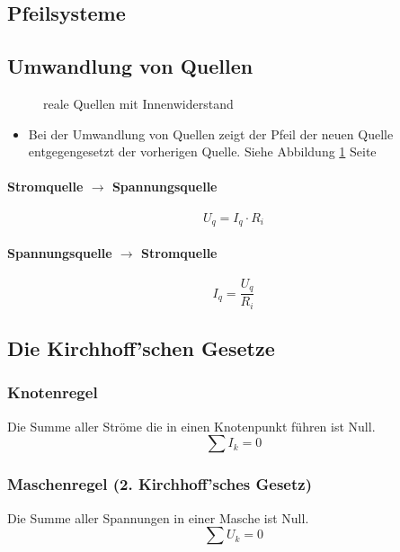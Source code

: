 \subsection{Pfeilsysteme}
\label{sec:Pfeilsysteme}

\subsection{Umwandlung von Quellen}
\label{sec:UmwandlungVonQuellen}


\begin{figure}[H]
	\centering
	\caption{reale Quellen mit Innenwiderstand}
	\label{fig:reale_Quellen}
\end{figure}


\begin{itemize}
	\item Bei der Umwandlung von Quellen zeigt der Pfeil der neuen Quelle entgegengesetzt der vorherigen Quelle. Siehe Abbildung \ref{fig:reale_Quellen} Seite 
\end{itemize}
\pageref{fig:reale_Quellen}

\paragraph{Stromquelle $\rightarrow$ Spannungsquelle}
\label{sec:StromquelleSpannungsquelle}
\[
U_q=I_q\cdot R_i
\]

\paragraph{Spannungsquelle $\rightarrow$ Stromquelle}
\label{sec:SpannungsquelleStromquelle}
\[
I_q=\frac{U_q}{R_i}
\]



\subsection{Die Kirchhoff'schen Gesetze}
\label{sec:DieKirchhoffSchenGesetze}

\subsubsection{Knotenregel}
\label{sec:Knotenregel (1. Kirchhoff'sches Gesetz}
Die Summe aller Ströme die in einen Knotenpunkt führen ist Null.
\[
\sum I_k = 0
\]


\subsubsection{Maschenregel (2. Kirchhoff'sches Gesetz)}
\label{sec:Maschenregel}
Die Summe aller Spannungen in einer Masche ist Null.
\[
\sum U_k = 0
\]

